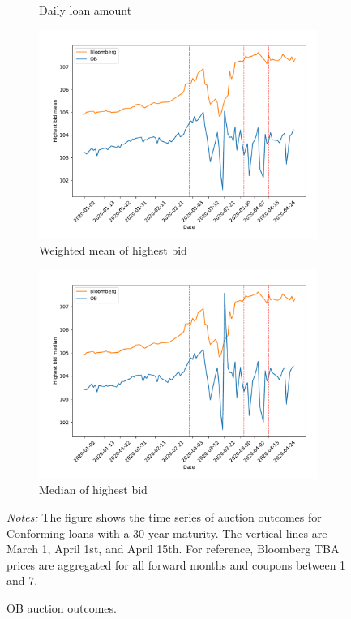 \documentclass[11pt,a4paper]{article}
\begin{document}
\begin{figure}[h]
\begin{subfigure}[b]{0.49\textwidth}
      \caption{ Daily loan amount}
     \end{subfigure}
     \begin{subfigure}[b]{0.49\textwidth}
      \includegraphics[width=0.998\textwidth]{../results/figures/w_winner_bid_mean_mat30_loan1_timeseries_nr_1_7.pdf}
      \caption{ Weighted mean of highest bid}
     \end{subfigure}
     \begin{subfigure}[b]{0.49\textwidth}
      \includegraphics[width=0.998\textwidth]{../results/figures/winner_bid_median_mat30_loan1_timeseries_nr_1_7.pdf}
      \caption{ Median of highest bid}
     \end{subfigure}
   \caption{OB auction outcomes. } 
   \begin{minipage}{\textwidth}
      \footnotesize{\textit{Notes:} The figure shows the time series of auction outcomes for Conforming loans with a 30-year maturity.  The vertical lines are March 1, April 1st, and April 15th. For reference, Bloomberg TBA prices are aggregated for all forward months and coupons between 1 and 7. }
      \end{minipage}
\end{figure}
\end{document}
